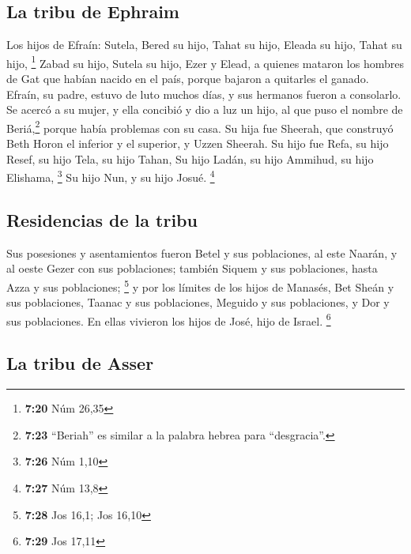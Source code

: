 \begin{paracol}{2}
\hypertarget{la-tribu-de-ephraim}{%
\subsection{La tribu de Ephraim}\label{la-tribu-de-ephraim}}

 Los hijos de Efraín: Sutela, Bered su hijo, Tahat su
hijo, Eleada su hijo, Tahat su hijo, \footnote{\textbf{7:20} Núm 26,35}
 Zabad su hijo, Sutela su hijo, Ezer y Elead, a quienes
mataron los hombres de Gat que habían nacido en el país, porque bajaron
a quitarles el ganado.  Efraín, su padre, estuvo de luto
muchos días, y sus hermanos fueron a consolarlo.  Se
acercó a su mujer, y ella concibió y dio a luz un hijo, al que puso el
nombre de Beriá,\footnote{\textbf{7:23} ``Beriah'' es similar a la
  palabra hebrea para ``desgracia''.} porque había problemas con su
casa.  Su hija fue Sheerah, que construyó Beth Horon el
inferior y el superior, y Uzzen Sheerah.  Su hijo fue
Refa, su hijo Resef, su hijo Tela, su hijo Tahan,  Su
hijo Ladán, su hijo Ammihud, su hijo Elishama, \footnote{\textbf{7:26}
  Núm 1,10}  Su hijo Nun, y su hijo Josué. \footnote{\textbf{7:27}
  Núm 13,8}

\hypertarget{residencias-de-la-tribu}{%
\subsection{Residencias de la tribu}\label{residencias-de-la-tribu}}

 Sus posesiones y asentamientos fueron Betel y sus
poblaciones, al este Naarán, y al oeste Gezer con sus poblaciones;
también Siquem y sus poblaciones, hasta Azza y sus poblaciones;
\footnote{\textbf{7:28} Jos 16,1; Jos 16,10}  y por los
límites de los hijos de Manasés, Bet Sheán y sus poblaciones, Taanac y
sus poblaciones, Meguido y sus poblaciones, y Dor y sus poblaciones. En
ellas vivieron los hijos de José, hijo de Israel. \footnote{\textbf{7:29}
  Jos 17,11}

\hypertarget{la-tribu-de-asser}{%
\subsection{La tribu de Asser}\label{la-tribu-de-asser}}


\end{paracol}
